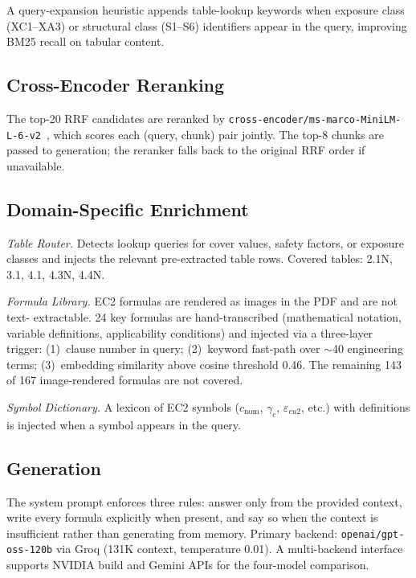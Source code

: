 \documentclass[conference]{IEEEtran}
\begin{document}
A query-expansion heuristic appends table-lookup keywords when exposure
class (XC1--XA3) or structural class (S1--S6) identifiers appear in
the query, improving BM25 recall on tabular content.

\subsection{Cross-Encoder Reranking}

The top-20 RRF candidates are reranked by
\texttt{cross-encoder/ms-marco-MiniLM-L-6-v2}~\cite{nogueira2019passage},
which scores each (query, chunk) pair jointly.
The top-8 chunks are passed to generation; the reranker falls back to
the original RRF order if unavailable.

\subsection{Domain-Specific Enrichment}

\textit{Table Router.}
Detects lookup queries for cover values, safety factors, or exposure
classes and injects the relevant pre-extracted table rows.
Covered tables: 2.1N, 3.1, 4.1, 4.3N, 4.4N.

\textit{Formula Library.}
EC2 formulas are rendered as images in the PDF and are not text-
extractable.
24 key formulas are hand-transcribed (mathematical notation, variable
definitions, applicability conditions) and injected via a three-layer
trigger: (1)~clause number in query; (2)~keyword fast-path over
$\sim$40 engineering terms; (3)~embedding similarity above cosine
threshold 0.46.
The remaining 143 of 167 image-rendered formulas are not covered.

\textit{Symbol Dictionary.}
A lexicon of EC2 symbols ($c_{\mathrm{nom}}$, $\gamma_c$,
$\varepsilon_{cu2}$, etc.) with definitions is injected when a symbol
appears in the query.

\subsection{Generation}

The system prompt enforces three rules: answer only from the provided
context, write every formula explicitly when present, and say so when
the context is insufficient rather than generating from memory.
Primary backend: \texttt{openai/gpt-oss-120b} via Groq (131K context,
temperature 0.01).
A multi-backend interface supports NVIDIA build and Gemini APIs for the
four-model comparison.
\end{document}

